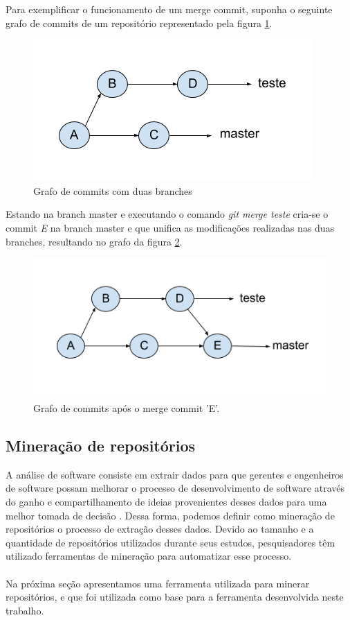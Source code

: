 \documentclass[a4paper,12pt]{article}
\begin{document}
Para exemplificar o funcionamento de um merge commit, suponha o seguinte grafo de commits de um repositório representado pela figura \ref{fig:graphBefore}.

 \begin{figure}[h]
 \centering
 \includegraphics[width=0.65\linewidth]{imgs/graph_before.png}
 \caption{Grafo de commits com duas branches}
 \label{fig:graphBefore}
 \end{figure}



Estando na branch master e executando o comando \textit{git merge teste} cria-se o commit \textit{E} na branch master e que unifica as modificações realizadas nas duas branches, resultando no grafo da figura \ref{fig:graphAfter}.

 \begin{figure}[H]
 \centering
 \includegraphics[width=0.65\linewidth]{imgs/graph_after.png}
 \caption{Grafo de commits após o merge commit 'E'.}
 \label{fig:graphAfter}
 \end{figure}


\subsection{Mineração de repositórios}%
\label{sec:mining}



A análise de software consiste em extrair dados para que gerentes e engenheiros de software possam melhorar o processo de desenvolvimento de software através do ganho e compartilhamento de ideias provenientes desses dados para uma melhor tomada de decisão \cite{soWhat}. Dessa forma, podemos definir como mineração de repositórios o processo de  extração desses dados. Devido ao tamanho e a quantidade de repositórios utilizados durante seus estudos, pesquisadores têm utilizado ferramentas de mineração para automatizar esse processo. %
\\
\\
Na próxima seção apresentamos uma ferramenta utilizada para minerar repositórios, e que foi utilizada como base para a ferramenta desenvolvida neste trabalho.
\end{document}
